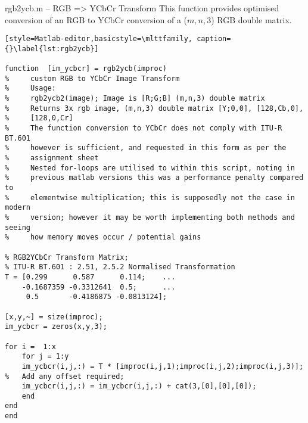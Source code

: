 
\begin{codeblock}{rgb2ycb.m -- RGB => YCbCr Transform}
This function provides optimised conversion of an RGB to YCbCr conversion of a ($m,n,3$) RGB double matrix.
    
\begin{lstlisting}[style=Matlab-editor,basicstyle=\mlttfamily, caption={}\label{lst:rgb2ycb}]
   
function  [im_ycbcr] = rgb2ycb(improc)
%     custom RGB to YCbCr Image Transform
%     Usage:
%     rgb2ycb2(image); Image is [R;G;B] (m,n,3) double matrix
%     Returns 3x rgb image, (m,n,3) double matrix [Y;0,0], [128,Cb,0], 
%     [128,0,Cr]
%     The function conversion to YCbCr does not comply with ITU-R BT.601
%     however is sufficient, and requested in this form as per the 
%     assignment sheet
%     Nested for-loops are utilised to within this script, noting in 
%     previous matlab versions this was a performance penalty compared to 
%     elementwise multiplication; this is supposedly not the case in modern
%     version; however it may be worth implementing both methods and seeing
%     how memory moves occur / potential gains

% RGB2YCbCr Transform Matrix;
% ITU-R BT.601 : 2.51, 2.5.2 Normalised Transformation 
T = [0.299      0.587      0.114;    ...
    -0.1687359 -0.3312641  0.5;      ...
     0.5       -0.4186875 -0.0813124]; 

[x,y,~] = size(improc);
im_ycbcr = zeros(x,y,3);

for i =  1:x
    for j = 1:y
    im_ycbcr(i,j,:) = T * [improc(i,j,1);improc(i,j,2);improc(i,j,3)];
%   Add any offset required; 
    im_ycbcr(i,j,:) = im_ycbcr(i,j,:) + cat(3,[0],[0],[0]); 
    end
end
end

\end{lstlisting}
\end{codeblock}
\clearpage

